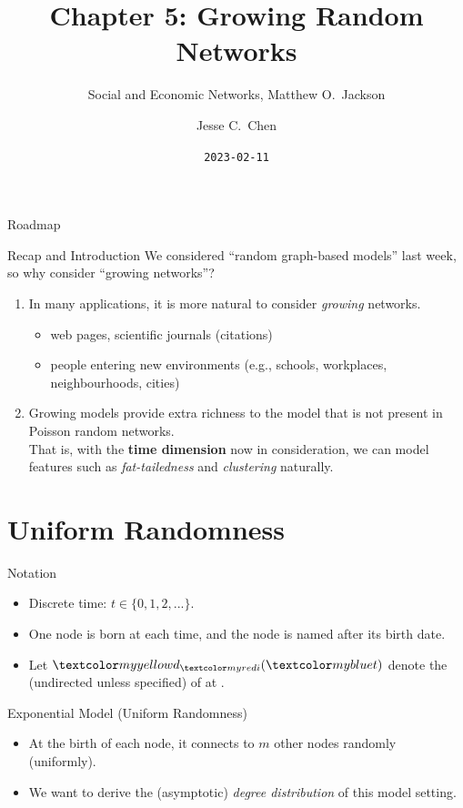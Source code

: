 \documentclass{beamer}
\title{Chapter 5: Growing Random Networks}
\subtitle{Social and Economic Networks, Matthew O.\ Jackson}
\author{Jesse C.\ Chen}
\date{\texttt{2023-02-11}}
\begin{document}
\begin{frame}{}
	\maketitle
\end{frame}

\begin{frame}{Roadmap}
	\tableofcontents
\end{frame}

\begin{frame}{Recap and Introduction}
	We considered ``random graph-based models'' last week,
	so why consider ``growing networks''?
	\begin{enumerate}
		\item
			In many applications, it is more natural to consider \emph{growing} networks.
			\begin{itemize}
				\item web pages, scientific journals (citations)
				\item people entering new environments (e.g., schools, workplaces, neighbourhoods, cities)
			\end{itemize}
		\item
			Growing models provide extra richness to the model that is not present in Poisson random networks. \\
			That is, with the \textbf{time dimension} now in consideration,
			we can model features such as \emph{fat-tailedness} and \emph{clustering} naturally.
	\end{enumerate}
\end{frame}

\section{Uniform Randomness}

\begin{frame}{Notation}
	\begin{itemize}
		\item
			Discrete time: $t\in\{0,1,2,...\}$.
		\item
			One node is born at each time, and the node is named after its birth date.
		\item
			Let $\yellow{d}_{\red{i}}(\blue{t})$ denote the  (undirected unless specified) of  at .
	\end{itemize}
\end{frame}

\begin{frame}{Exponential Model (Uniform Randomness)}
	\begin{itemize}
		\item
			At the birth of each node,
			it connects to $m$ other nodes randomly (uniformly).
		\item
			We want to derive the (asymptotic) \emph{degree distribution} of this model setting.
	\end{itemize}
\end{frame}
\end{document}
